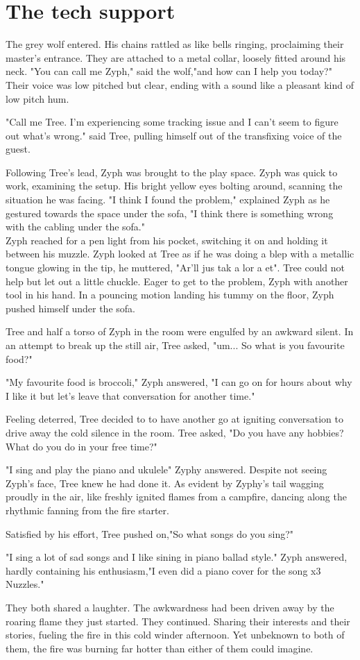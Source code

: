 \chapter{The tech support}

The grey wolf entered. His chains rattled as like bells ringing, proclaiming their master's entrance. They are attached to a metal collar, loosely fitted around his neck. "You can call me Zyph," said the wolf,"and how can I help you today?" Their voice was low pitched but clear, ending with a sound like a pleasant kind of low pitch hum.

"Call me Tree. I'm experiencing some tracking issue and I can't seem to figure out what's wrong." said Tree, pulling himself out of the transfixing voice of the guest.

Following Tree's lead, Zyph was brought to the play space. Zyph was quick to work, examining the setup. His bright yellow eyes bolting around, scanning the situation he was facing. "I think I found the problem," explained Zyph as he gestured towards the space under the sofa, "I think there is something wrong with the cabling under the sofa."\\
Zyph reached for a pen light from his pocket, switching it on and holding it between his muzzle. Zyph looked at Tree as if he was doing a blep with a metallic tongue glowing in the tip, he muttered, "Ar'll jus tak a lor a et". Tree could not help but let out a little chuckle. Eager to get to the problem, Zyph with another tool in his hand. In a pouncing motion landing his tummy on the floor, Zyph pushed himself under the sofa.

Tree and half a torso of Zyph in the room were engulfed by an awkward silent. In an attempt to break up the still air, Tree asked, "um... So what is you favourite food?"

"My favourite food is broccoli," Zyph answered, "I can go on for hours about why I like it but let's leave that conversation for another time."

Feeling deterred, Tree decided to to have another go at igniting conversation to drive away the cold silence in the room. Tree asked, "Do you have any hobbies? What do you do in your free time?"

"I sing and play the piano and ukulele" Zyphy answered. Despite not seeing Zyph's face, Tree knew he had done it. As evident by Zyphy's tail wagging proudly in the air, like freshly ignited flames from a campfire, dancing along the rhythmic fanning from the fire starter.

Satisfied by his effort, Tree pushed on,"So what songs do you sing?"

"I sing a lot of sad songs and I like sining in piano ballad style." Zyph answered, hardly containing his enthusiasm,"I even did a piano cover for the song x3 Nuzzles."

They both shared a laughter. The awkwardness had been driven away by the roaring flame they just started. They continued. Sharing their interests and their stories, fueling the fire in this cold winder afternoon. Yet unbeknown to both of them, the fire was burning far hotter than either of them could imagine.